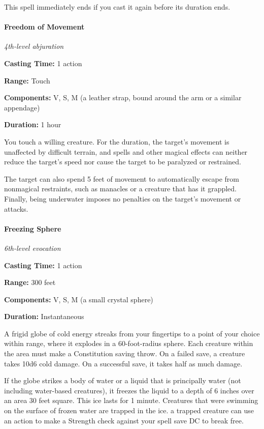 \documentclass[
]{article}
\begin{document}
This spell immediately ends if you cast it again before its duration
ends.

\hypertarget{freedom-of-movement}{%
\paragraph{Freedom of Movement}\label{freedom-of-movement}}

\emph{4th-level abjuration}

\textbf{Casting Time:} 1 action

\textbf{Range:} Touch

\textbf{Components:} V, S, M (a leather strap, bound around the arm or a
similar appendage)

\textbf{Duration:} 1 hour

You touch a willing creature. For the duration, the target's movement is
unaffected by difficult terrain, and spells and other magical effects
can neither reduce the target's speed nor cause the target to be
paralyzed or restrained.

The target can also spend 5 feet of movement to automatically escape
from nonmagical restraints, such as manacles or a creature that has it
grappled. Finally, being underwater imposes no penalties on the target's
movement or attacks.

\hypertarget{freezing-sphere}{%
\paragraph{Freezing Sphere}\label{freezing-sphere}}

\emph{6th-level evocation}

\textbf{Casting Time:} 1 action

\textbf{Range:} 300 feet

\textbf{Components:} V, S, M (a small crystal sphere)

\textbf{Duration:} Instantaneous

A frigid globe of cold energy streaks from your fingertips to a point of
your choice within range, where it explodes in a 60-foot-radius sphere.
Each creature within the area must make a Constitution saving throw. On
a failed save, a creature takes 10d6 cold damage. On a successful save,
it takes half as much damage.

If the globe strikes a body of water or a liquid that is principally
water (not including water-based creatures), it freezes the liquid to a
depth of 6 inches over an area 30 feet square. This ice lasts for 1
minute. Creatures that were swimming on the surface of frozen water are
trapped in the ice. a trapped creature can use an action to make a
Strength check against your spell save DC to break free.
\end{document}
